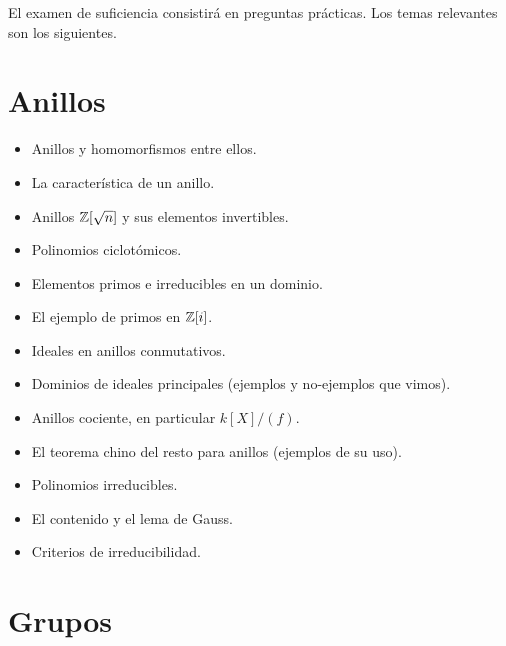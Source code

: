 \documentclass{article}
\begin{document}

El examen de suficiencia consistirá en preguntas prácticas. Los temas relevantes
son los siguientes.

\section*{Anillos}

\begin{itemize}
\item Anillos y homomorfismos entre ellos.

\item La característica de un anillo.

\item Anillos $\mathbb{Z} [\sqrt{n}]$ y sus elementos invertibles.

\item Polinomios ciclotómicos.

\item Elementos primos e irreducibles en un dominio.

\item El ejemplo de primos en $\mathbb{Z} [i]$.

\item Ideales en anillos conmutativos.

\item Dominios de ideales principales (ejemplos y no-ejemplos que vimos).

\item Anillos cociente, en particular $k [X]/(f)$.

\item El teorema chino del resto para anillos (ejemplos de su uso).

\item Polinomios irreducibles.

\item El contenido y el lema de Gauss.

\item Criterios de irreducibilidad.
\end{itemize}


\section*{Grupos}
\end{document}

